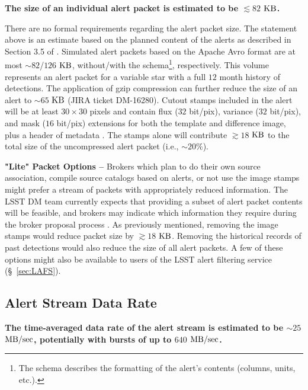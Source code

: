\documentclass[DM,authoryear,toc]{lsstdoc}
\begin{document}
{\bf The size of an individual alert packet is estimated to be $\lesssim82$ $\rm KB$.}

There are no formal requirements regarding the alert packet size. The statement above is an estimate based on the planned content of the alerts as described in Section 3.5 of . Simulated alert packets based on the Apache Avro format are at most $\sim82$/$126$ $\rm KB$, without/with the schema\footnote{The schema describes the formatting of the alert's contents (columns, units, etc.).}, respectively. This volume represents an alert packet for a variable star with a full $12$ month history of detections. 
The application of gzip compression can further reduce the size of an alert to $\sim65$ $\rm KB$ (JIRA ticket DM-16280). Cutout stamps included in the alert will be at least $30\times30$ pixels and contain flux ($32$ bit/pix), variance ($32$ bit/pix), and mask ($16$ bit/pix) extensions for both the template and difference image, plus a header of metadata . The stamps alone will contribute $\gtrsim18$ $\rm KB$ to the total size of the uncompressed alert packet (i.e., $\sim20\%$).

{\bf "Lite" Packet Options --} Brokers which plan to do their own source association, compile source catalogs based on alerts, or not use the image stamps might prefer a stream of packets with appropriately reduced information. The LSST DM team currently expects that providing a subset of alert packet contents will be feasible, and brokers may indicate which information they require during the broker proposal process  . As previously mentioned, removing the image stamps would reduce packet size by $\gtrsim18$ $\rm KB$. Removing the historical records of past detections would also reduce the size of all alert packets. A few of these options might also be available to users of the LSST alert filtering service (\S~\ref{sec:LAFS}). 


\subsection{Alert Stream Data Rate}\label{ssec:data_rate}

{\bf The time-averaged data rate of the alert stream is estimated to be $\sim25$ $\rm MB/sec$, potentially with bursts of up to $640$ $\rm MB/sec$.}
\end{document}
